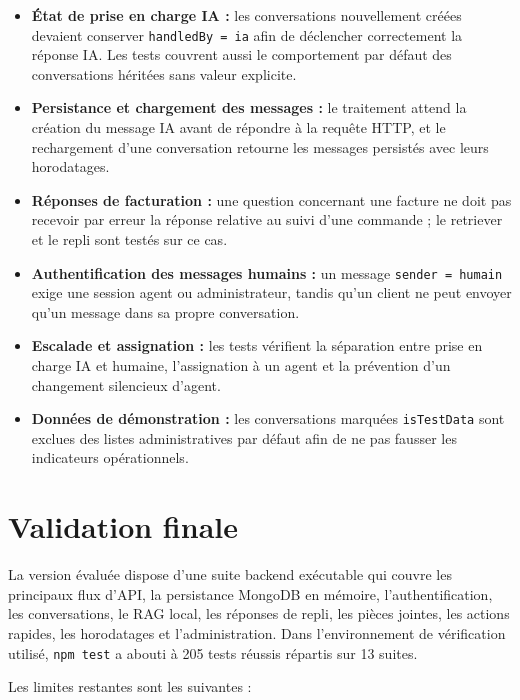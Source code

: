 \begin{itemize}[leftmargin=1.4em]
  \item \textbf{État de prise en charge IA :} les conversations nouvellement créées devaient conserver \texttt{handledBy = ia} afin de déclencher correctement la réponse IA. Les tests couvrent aussi le comportement par défaut des conversations héritées sans valeur explicite.
  \item \textbf{Persistance et chargement des messages :} le traitement attend la création du message IA avant de répondre à la requête HTTP, et le rechargement d'une conversation retourne les messages persistés avec leurs horodatages.
  \item \textbf{Réponses de facturation :} une question concernant une facture ne doit pas recevoir par erreur la réponse relative au suivi d'une commande ; le retriever et le repli sont testés sur ce cas.
  \item \textbf{Authentification des messages humains :} un message \texttt{sender = humain} exige une session agent ou administrateur, tandis qu'un client ne peut envoyer qu'un message dans sa propre conversation.
  \item \textbf{Escalade et assignation :} les tests vérifient la séparation entre prise en charge IA et humaine, l'assignation à un agent et la prévention d'un changement silencieux d'agent.
  \item \textbf{Données de démonstration :} les conversations marquées \texttt{isTestData} sont exclues des listes administratives par défaut afin de ne pas fausser les indicateurs opérationnels.
\end{itemize}

\section{Validation finale}

La version évaluée dispose d'une suite backend exécutable qui couvre les principaux flux d'API, la persistance MongoDB en mémoire, l'authentification, les conversations, le RAG local, les réponses de repli, les pièces jointes, les actions rapides, les horodatages et l'administration. Dans l'environnement de vérification utilisé, \texttt{npm test} a abouti à 205 tests réussis répartis sur 13 suites.

Les limites restantes sont les suivantes :

